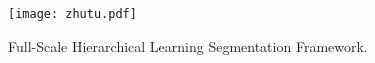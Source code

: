

\begin{figure}       
	\centering
    \texttt{[image: zhutu.pdf]}  
	\caption{Full-Scale Hierarchical Learning Segmentation Framework.}   
	\label{FIG:1}
 \vskip -0.2in
\end{figure}


